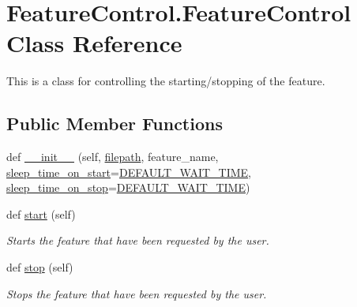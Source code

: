 \hypertarget{classFeatureControl_1_1FeatureControl}{}\section{Feature\+Control.\+Feature\+Control Class Reference}
\label{classFeatureControl_1_1FeatureControl}


This is a class for controlling the starting/stopping of the feature.  


\subsection*{Public Member Functions}
\begin{DoxyCompactItemize}
\item 
def \hyperlink{classFeatureControl_1_1FeatureControl_aaddbe7a1596f71ce1a6d462e728c438b}{\+\_\+\+\_\+init\+\_\+\+\_\+} (self, \hyperlink{classFeatureControl_1_1FeatureControl_a109435a4846e1d31370f92e12a9cb645}{filepath}, feature\+\_\+name, \hyperlink{classFeatureControl_1_1FeatureControl_a5911b30613b10be90a2ab8519bdc5bb2}{sleep\+\_\+time\+\_\+on\+\_\+start}=\hyperlink{namespaceFeatureControl_aeebd4e13e6a3a0dde7d720af530ae36d}{D\+E\+F\+A\+U\+L\+T\+\_\+\+W\+A\+I\+T\+\_\+\+T\+I\+ME}, \hyperlink{classFeatureControl_1_1FeatureControl_aa577601585488e8fed13f9a1ad36d7b3}{sleep\+\_\+time\+\_\+on\+\_\+stop}=\hyperlink{namespaceFeatureControl_aeebd4e13e6a3a0dde7d720af530ae36d}{D\+E\+F\+A\+U\+L\+T\+\_\+\+W\+A\+I\+T\+\_\+\+T\+I\+ME})
\item 
def \hyperlink{classFeatureControl_1_1FeatureControl_a21f4c45cce80b2be3a1110d44e12fbfc}{start} (self)
\begin{DoxyCompactList}\small\item\em Starts the feature that have been requested by the user. \end{DoxyCompactList}\item 
def \hyperlink{classFeatureControl_1_1FeatureControl_a1dc5cd2f9a7fe0aa97c77a4f5f6d1c86}{stop} (self)
\begin{DoxyCompactList}\small\item\em Stops the feature that have been requested by the user. \end{DoxyCompactList}\end{DoxyCompactItemize}

